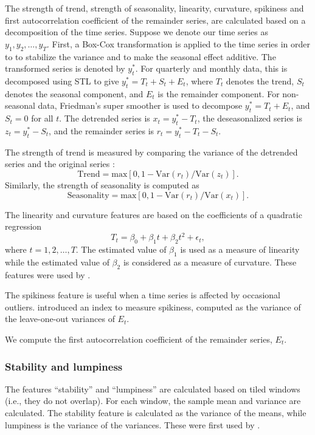 \documentclass[11pt,a4paper,]{article}
\def\var{\text{Var}}
\theoremstyle{definition}
\theoremstyle{definition}
\theoremstyle{definition}
\theoremstyle{remark}
\begin{document}
The strength of trend, strength of seasonality, linearity, curvature,
spikiness and first autocorrelation coefficient of the remainder series,
are calculated based on a decomposition of the time series. Suppose we
denote our time series as \(y_1, y_2, \dots,y_T\). First, a Box-Cox
transformation is applied to the time series in order to to stabilize
the variance and to make the seasonal effect additive. The transformed
series is denoted by \(y_{t}^*\). For quarterly and monthly data, this
is decomposed using STL \autocite{cleveland1990stl} to give
\(y_t^*=T_t+S_t+E_t\), where \(T_t\) denotes the trend, \(S_t\) denotes
the seasonal component, and \(E_t\) is the remainder component. For
non-seasonal data, Friedman's super smoother \autocite{supsmu} is used
to decompose \(y_t^*=T_t+E_t\), and \(S_t=0\) for all \(t\). The
detrended series is \(x_t=y_t^*-T_t\), the deseasonalized series is
\(z_t=y_t^*-S_t\), and the remainder series is \(r_t=y_t^*-T_t-S_t\).

The strength of trend is measured by comparing the variance of the
detrended series and the original series \autocite{wang2009rule}: \[
    \text{Trend} = \text{max}\left[0, 1 - \var(r_{t})/\var(z_{t})\right].
\] Similarly, the strength of seasonality is computed as \[
    \text{Seasonality} = \text{max}\left[0, 1- \var(r_{t})/ \var(x_{t})\right].
\]

The linearity and curvature features are based on the coefficients of a
quadratic regression \[
  T_t=\beta_0+\beta_1 t + \beta_2t^2+\epsilon_t,
\] where \(t=1, 2, \dots,T\). The estimated value of \(\beta_1\) is used
as a measure of linearity while the estimated value of \(\beta_2\) is
considered as a measure of curvature. These features were used by
\textcite{hyndman2015large}.

The spikiness feature is useful when a time series is affected by
occasional outliers. \textcite{hyndman2015large} introduced an index to
measure spikiness, computed as the variance of the leave-one-out
variances of \(E_t\).

We compute the first autocorrelation coefficient of the remainder
series, \(E_t\).

\subsubsection*{Stability and lumpiness}\label{stability-and-lumpiness}

The features ``stability'' and ``lumpiness'' are calculated based on
tiled windows (i.e., they do not overlap). For each window, the sample
mean and variance are calculated. The stability feature is calculated as
the variance of the means, while lumpiness is the variance of the
variances. These were first used by \textcite{hyndman2015large}.
\end{document}
